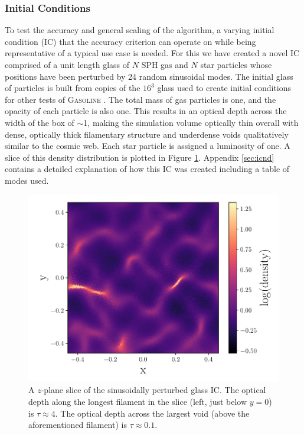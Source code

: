 \documentclass[fleq,usenatbib]{mnras}
\begin{document}
\subsubsection{Initial Conditions}
To test the accuracy and general scaling of the algorithm, a varying initial 
condition (IC) that the accuracy criterion can operate on while being 
representative of a typical use case is needed. For this we have created a 
novel IC comprised of a unit length glass of $N$ SPH gas and $N$ star 
particles whose positions have been perturbed by 24 random sinusoidal modes. 
The initial glass of particles is built from copies of the $16^3$ glass used 
to create initial conditions for other tests of \textsc{Gasoline} 
\citep{wadsleyEt17}. The total mass of gas particles is one, and the opacity 
of each particle is also one. This results in an optical depth across the 
width of the box of $\sim$1, making the simulation volume optically thin 
overall with dense, optically thick filamentary structure and underdense voids 
qualitatively similar to the cosmic web. Each star particle is assigned a 
luminosity of one. A slice of this density distribution is plotted in Figure 
\ref{fig:sine_rho}. Appendix \ref{sec:icnd} contains a detailed explanation of 
how this IC was created including a table of modes used.
\begin{figure}
\includegraphics[width=1\linewidth]{Figures/sine_rho.pdf}
\caption{A $z$-plane slice of the sinusoidally perturbed glass IC. The optical 
depth along the longest filament in the slice (left, just below $y=0$) is
$\tau\approx 4$. The optical depth across the largest void (above the 
aforementioned filament) is $\tau\approx 0.1$.}
\label{fig:sine_rho}
\end{figure}
\end{document}
